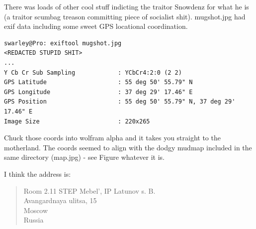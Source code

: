 \documentclass[11pt]{report}
\begin{document}
There was loads of other cool stuff indicting the traitor Snowdenz for what he is (a traitor scumbag treason committing piece of socialist shit).
mugshot.jpg had exif data including some sweet GPS locational coordination.
\begin{lstlisting}
swarley@Pro: exiftool mugshot.jpg
<REDACTED STUPID SHIT>
...
Y Cb Cr Sub Sampling            : YCbCr4:2:0 (2 2)
GPS Latitude                    : 55 deg 50' 55.79" N
GPS Longitude                   : 37 deg 29' 17.46" E
GPS Position                    : 55 deg 50' 55.79" N, 37 deg 29' 17.46" E
Image Size                      : 220x265
\end{lstlisting}

Chuck those coords into wolfram alpha and it takes you straight to the motherland. The coords seemed to align with the dodgy mudmap included in the same directory (map.jpg) - see Figure whatever it is.

I think the address is:

\begin{quotation}
Room 2.11
STEP Mebel', IP Latunov s. B.\\
    Avangardnaya ulitsa, 15\\
    Moscow\\
    Russia\\
\end{quotation}
\end{document}
